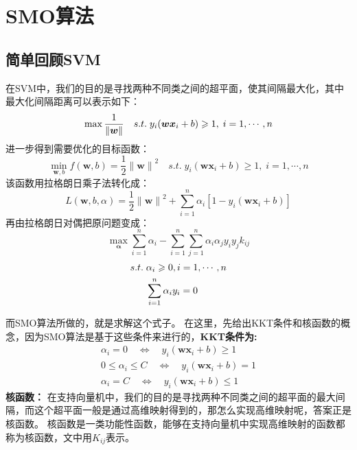 \documentclass[UTF8]{ctexart}
\begin{document}
\section{SMO算法}

\subsection{简单回顾SVM}
在SVM中，我们的目的是寻找两种不同类之间的超平面，使其间隔最大化，其中最大化间隔距离可以表示如下：
\begin{equation}\notag
    \max\frac{1}{\| \boldsymbol w\|} \quad s.t.\; y_i( \boldsymbol w \boldsymbol x_i+b) \geqslant 1,\; i=1,\cdots ,n 
\end{equation}
进一步得到需要优化的目标函数：
\begin{equation} 
    \min_{\boldsymbol w,b} f(\boldsymbol w,b)=\frac{1}{2} {\| \boldsymbol w\|}^2 \quad s.t.\; y_i( \boldsymbol w \boldsymbol x_i+b) \geqslant 1,\; i=1,\cdots ,n 
\end{equation}
该函数用拉格朗日乘子法转化成：
\[ L(\boldsymbol w,b,\alpha ) = \frac{1}{2} {\| \boldsymbol w\|}^2 + \sum_{i=1}^n \alpha_i [1-y_i(\boldsymbol w \boldsymbol x_i + b)]  \]
再由拉格朗日对偶把原问题变成：
\begin{equation}
    \max_{\boldsymbol\alpha} \sum_{i=1}^n \alpha_i - \sum_{i=1}^n \sum_{j=1}^n \alpha_i \alpha_j y_i y_j k_{ij} 
\end{equation}
\begin{equation}\notag
    \begin{aligned}
        s.t.\; 
        &{\alpha_i \geqslant 0,i=1,\cdots,n } \\ 
        & \sum_{i=1}^n \alpha_i y_i = 0 
    \end{aligned}
\end{equation}

\noindent 而SMO算法所做的，就是求解这个式子。
在这里，先给出KKT条件和核函数的概念，因为SMO算法是基于这些条件来进行的，\textbf{KKT条件为:}
\begin{equation}
    \begin{aligned}
        \alpha_i=0 \quad \iff \quad y_i(\boldsymbol w \boldsymbol x_i + b) \geqslant 1 \\
        0 \leqslant \alpha_i \leqslant C \quad \iff \quad y_i(\boldsymbol w \boldsymbol x_i + b) = 1 \\
        \alpha_i=C \quad \iff \quad y_i(\boldsymbol w \boldsymbol x_i + b) \leqslant 1
    \end{aligned}
\end{equation}
\noindent \large \textbf{核函数：}
在支持向量机中，我们的目的是寻找两种不同类之间的超平面的最大间隔，而这个超平面一般是通过高维映射得到的，那怎么实现高维映射呢，答案正是核函数。
核函数是一类功能性函数，能够在支持向量机中实现高维映射的函数都称为核函数，文中用$K_{ij}$表示。
\end{document}

